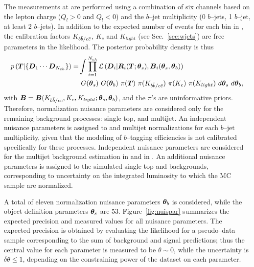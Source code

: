The measurements at \eighttev{}  are
performed using a combination of six channels based on
the lepton charge ($Q_l>0$ and $Q_l<0$) and the $b$--jet multiplicity
(0 $b$--jets, 1 $b$--jet, at least 2 $b$--jets). In addition to the
expected number of \ttbar{} events for each bin in \Truth{}, the
\wjets{} calibration factors $K_{b\bar{b}{}/c\bar{c}{}}$, $K_c$ and
$K_{light}$ (see Sec.~\ref{sec:wjets}) are free parameters in the likelihood.
The posterior probability density is thus
\begin{equation}
\begin{split}
  p\left(\boldsymbol{T}{}|\{\boldsymbol{D}{}_1\cdots{}\boldsymbol{D}{}_{N_{ch}}\}\right)=&
  \int
  \prod_{i=1}^{N_{ch}}\mathcal{L}\left(\boldsymbol{D}{}_i|\boldsymbol{R}{}_i(\boldsymbol{T}{};\boldsymbol{\theta}{}_s),\boldsymbol{B}{}_i(\boldsymbol{\theta}{}_s,\boldsymbol{\theta}{}_b)\right)\\
&  ~G(\boldsymbol{\theta}{}_s)
  ~G(\boldsymbol{\theta}{}_b)
  ~\pi{}(\boldsymbol{T}{})
  ~\pi{}(K_{b\bar{b}{}/c\bar{c}{}})
  ~\pi{}(K_c)
  ~\pi{}(K_{light})
  ~d\boldsymbol{\theta}{}_s
  ~d\boldsymbol{\theta}{}_b,\\
\end{split}
\end{equation}
with
$\boldsymbol{B}{}=\boldsymbol{B}{}(K_{b\bar{b}{}/c\bar{c}{}},K_c,K_{light};\boldsymbol{\theta}_s,\boldsymbol{\theta}{}_b)$,
and the $\pi{}$'s are uninformative priors.
Therefore, normalization nuisance parameters are considered
only for the remaining background processes: single top, \zjets{} and
multijet. An independent nuisance parameters is assigned to \zjets{}
and multijet normalizations for each $b$--jet multiplicity, given that
the modeling of $b$--tagging efficiencies is not calibrated
specifically for these processes. Independent nuisance parameters are
considered for the multijet background estimation in \mujets{} and in
\ejets{}. An additional nuisance parameters is
assigned to the simulated single top and \zjets{} backgrounds,
corresponding to uncertainty on the integrated luminosity to which the
MC sample are normalized.

A total of eleven normalization nuisance parameters $\boldsymbol{\theta}_b$ is
considered, while the object definition parameters $\boldsymbol{\theta}_s$ are 53. 
Figure~\ref{fig:nuispar} summarizes the expected precision and measured
values for all nuisance parameters. The expected precision is obtained
by evaluating the likelihood for a pseudo--data sample corresponding
to the sum of background and signal predictions; thus the central
value for each parameter is measured to be $\theta\sim0$, while the
uncertainty is $\delta\theta\leq1$, depending on the constraining power of
the dataset on each parameter.

